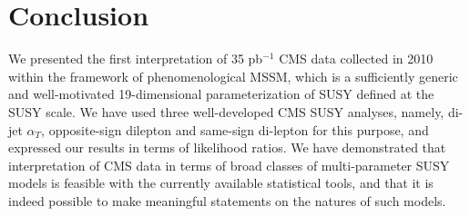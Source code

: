 \section{Conclusion}
\label{sec:conclusion}

We presented the first interpretation of 35 pb$^{-1}$ CMS data collected in 2010 within the framework of phenomenological MSSM, which is a sufficiently generic and well-motivated 19-dimensional parameterization of SUSY defined at the SUSY scale.  We have used three well-developed CMS SUSY analyses, namely, di-jet $\alpha_T$, opposite-sign dilepton and same-sign di-lepton for this purpose, and expressed our results in terms of likelihood ratios.  We have demonstrated that interpretation of CMS data in terms of broad classes of multi-parameter SUSY models is feasible with the currently available statistical tools, and that it is indeed possible to make meaningful statements on the natures of such models.
